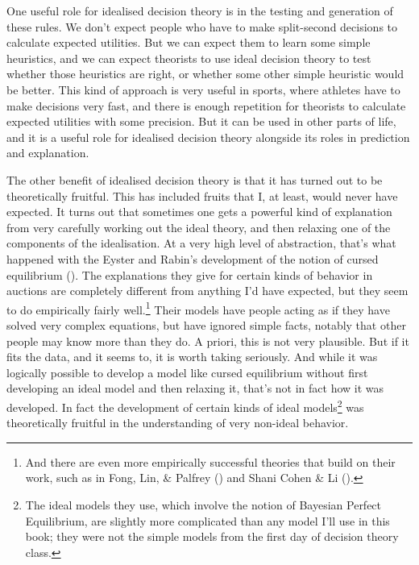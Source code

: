 \documentclass[
  12pt,
  letterpaper,
  DIV=11,
  numbers=noendperiod]{scrreprt}
\begin{document}
One useful role for idealised decision theory is in the testing and
generation of these rules. We don't expect people who have to make
split-second decisions to calculate expected utilities. But we can
expect them to learn some simple heuristics, and we can expect theorists
to use ideal decision theory to test whether those heuristics are right,
or whether some other simple heuristic would be better. This kind of
approach is very useful in sports, where athletes have to make decisions
very fast, and there is enough repetition for theorists to calculate
expected utilities with some precision. But it can be used in other
parts of life, and it is a useful role for idealised decision theory
alongside its roles in prediction and explanation.

The other benefit of idealised decision theory is that it has turned out
to be theoretically fruitful. This has included fruits that I, at least,
would never have expected. It turns out that sometimes one gets a
powerful kind of explanation from very carefully working out the ideal
theory, and then relaxing one of the components of the idealisation. At
a very high level of abstraction, that's what happened with the Eyster
and Rabin's development of the notion of cursed equilibrium
(). The
explanations they give for certain kinds of behavior in auctions are
completely different from anything I'd have expected, but they seem to
do empirically fairly well.\footnote{And there are even more empirically
  successful theories that build on their work, such as in Fong, Lin, \&
  Palfrey () and Shani Cohen \& Li
  ().} Their models have people
acting as if they have solved very complex equations, but have ignored
simple facts, notably that other people may know more than they do. A
priori, this is not very plausible. But if it fits the data, and it
seems to, it is worth taking seriously. And while it was logically
possible to develop a model like cursed equilibrium without first
developing an ideal model and then relaxing it, that's not in fact how
it was developed. In fact the development of certain kinds of ideal
models\footnote{The ideal models they use, which involve the notion of
  Bayesian Perfect Equilibrium, are slightly more complicated than any
  model I'll use in this book; they were not the simple models from the
  first day of decision theory class.} was theoretically fruitful in the
understanding of very non-ideal behavior.
\end{document}
